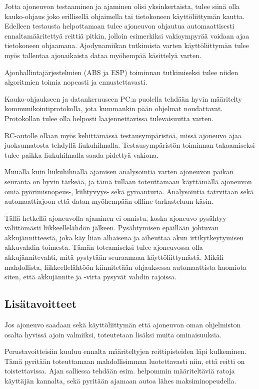 \documentclass{article}
\begin{document}
Jotta ajoneuvon testaaminen ja ajaminen olisi yksinkertaista, tulee siinä olla kauko-ohjaus joko erillisellä ohjaimella tai tietokoneen käyttöliittymän kautta. Edelleen testausta helpottamaan tulee ajoneuvon ohjautua automaattisesti ennaltamääritettyä reittiä pitkin, jolloin esimerkiksi vakioympyrää voidaan ajaa tietokoneen ohjaamana. Ajodynamiikan tutkimista varten käyttöliittymän tulee myös tallentaa ajonaikaista dataa myöhempää käsittelyä varten.

Ajonhallintajärjestelmien (ABS ja ESP) toiminnan tutkimiseksi tulee niiden algoritmien toimia nopeasti ja ennustettavasti.

Kauko-ohjaukseen ja datankeruuseen PC:n puolella tehdään hyvin määritelty kommunikointiprotokolla, jota kummankin pään ohjelmat noudattavat. Protokollan tulee olla helposti laajennettavissa tulevaisuutta varten.

RC-autolle ollaan myös kehittämässä testausympäristöä, missä ajoneuvo ajaa juoksumatosta tehdyllä liukuhihnalla. Testausympäristön toiminnan takaamiseksi tulee paikka liukuhihnalla saada pidettyä vakiona.

Muualla kuin liukuhihnalla ajamisen analysointia varten ajoneuvon paikan seuranta on hyvin tärkeää, ja tämä tullaan toteuttamaan käyttämällä ajoneuvon omia pyörimisnopeus-, kiihtyvyys- sekä gyroanturia. Analysointia tatrvitaan sekä automaattiajoon että datan myöhempään offline-tarkasteluun käsin.

Tällä hetkellä ajoneuvolla ajaminen ei onnistu, koska ajoneuvo pysähtyy välittömästi liikkeellelähdön jälkeen. Pysähtymisen epäillään johtuvan akkujännitteestä, joka käy liian alhaisena ja aiheuttaa akun irtikytkeytymisen akkuvahdin toimesta. Tämän toteamiseksi tulee ajoneuvossa olla akkujännitevahti, mitä pystytään seuraamaan käyttöliittymästä. Mikäli mahdollista, liikkeellelähtöön kiinnitetään ohjauksessa automaattista huomiota siten, että akkujännite ja -virta pysyvät vahdin rajoissa.

\subsection{Lisätavoitteet}

Jos ajoneuvo saadaan sekä käyttöliittymän että ajoneuvon oman ohjelmiston osalta hyvissä ajoin valmiiksi, toteutetaan lisäksi muita ominaisuuksia.

Perustavoitteisiin kuuluu ennalta määriteltyjen reittipisteiden läpi kulkeminen. Tämä pyritään toteuttamaan mahdollisimman luotettavasti niin, että reitti on toistettavissa. Ajan salliessa tehdään esim. helpommin määriteltäviä ratoja käyttäjän kannalta, sekä pyritään ajamaan autoa lähes maksiminopeudella.
\end{document}
